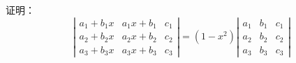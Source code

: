 \begin{frame}

\begin{testexample}
  证明：
  $$
  \left|
    \begin{array}{ccc}
      a_1+b_1x & a_1x+b_1 & c_1\\
      a_2+b_2x & a_2x+b_2 & c_2\\
      a_3+b_3x & a_3x+b_3 & c_3        
    \end{array}
  \right| = (1-x^2) \left|
    \begin{array}{ccc}
      a_1&b_1&c_1\\
      a_2&b_2&c_2\\
      a_3&b_3&c_3
    \end{array}
  \right|
  $$
\end{testexample}\pause


\end{frame}
